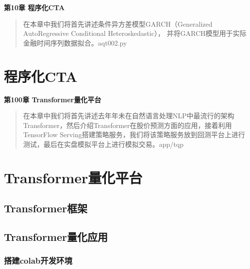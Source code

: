 \documentclass{article}
\begin{document}
\maketitle\begin{center}
\Large \textbf{第10章 程序化CTA}
\end{center}
\begin{abstract}
在本章中我们将首先讲述条件异方差模型GARCH（Generalized AutoRegressive Conditional Heteroskedastic），
并将GARCH模型用于实际金融时间序列数据拟合。aqt002.py
\end{abstract}
\section{程序化CTA}

\maketitle\begin{center}
\Large \textbf{第100章 \quad Transformer量化平台}
\end{center}
\begin{abstract}
在本章中我们将首先讲述去年年未在自然语言处理NLP中最流行的架构Transformer，然后介绍Transformer在股价预测方面的应用，接着利用TensorFlow Serving搭建策略服务，我们将该策略服务放到回测平台上进行测试，最后在实盘模拟平台上进行模拟交易。app/tqp
\end{abstract}
\section{Transformer量化平台}
\subsection{Transformer框架}
\subsection{Transformer量化应用}
\subsubsection{搭建colab开发环境}
\end{document}
